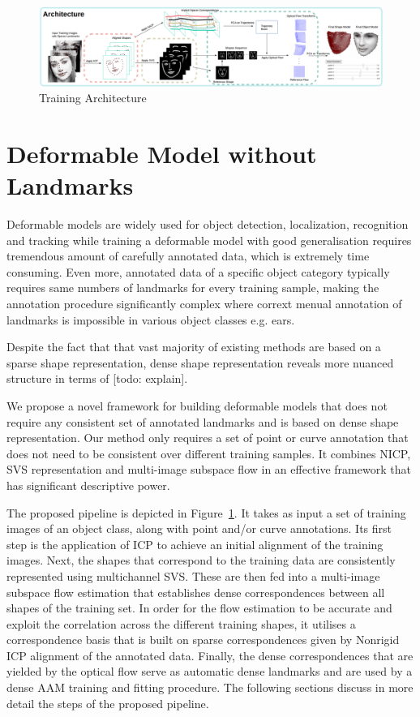 \begin{figure}[t!]
    \centering
        \includegraphics[width=\textwidth]{resources/architecture}
    \caption{Training Architecture}
    \label{fig:archi}
\end{figure}

\section{Deformable Model without Landmarks}

Deformable models are widely used for object detection, localization, recognition and tracking while training a deformable model with good generalisation requires tremendous amount of carefully annotated data, which is extremely time consuming. Even more, annotated data of a specific object category typically requires same numbers of landmarks for every training sample, making the annotation procedure significantly complex where corrext menual annotation of landmarks is impossible in various object classes e.g. ears.

Despite the fact that that vast majority of existing methods are based on a sparse shape representation, dense shape representation reveals more nuanced structure in terms of [todo: explain].

We propose a novel framework for building deformable models that does not require any consistent set of annotated landmarks and is based on dense shape representation. Our method only requires a set of point or curve annotation that does not need to be consistent over different training samples. It combines NICP, SVS representation and multi-image subspace flow in an effective framework that has significant descriptive power.

The proposed pipeline is depicted in Figure~\ref{fig:archi}. It takes as input a set of training images of an object class, along with point and/or curve annotations. Its first step is the application of ICP to achieve an initial alignment of the training images. Next, the shapes that correspond to the training data are consistently represented using multichannel SVS. These are then fed into a multi-image subspace flow estimation that establishes dense correspondences between all shapes of the training set. In order for the flow estimation to be accurate and exploit the correlation across the different training shapes, it utilises a correspondence basis that is built on sparse correspondences given by Nonrigid ICP alignment of the annotated data. Finally, the dense correspondences that are yielded by the optical flow serve as automatic dense landmarks and are used by a dense AAM training and fitting procedure. The following sections discuss in more detail the steps of the proposed pipeline.



